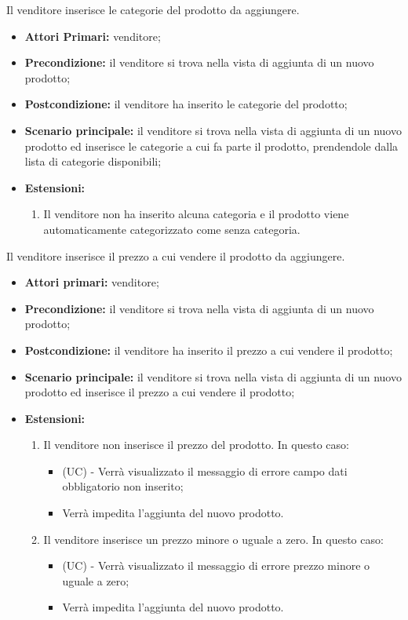 Il venditore inserisce le categorie del prodotto da aggiungere.
\begin{itemize}
    \item \textbf{Attori Primari:} venditore;
    \item \textbf{Precondizione:} il venditore si trova nella vista di aggiunta di un nuovo prodotto;
    \item \textbf{Postcondizione:} il venditore ha inserito le categorie del prodotto;
    \item \textbf{Scenario principale:} il venditore si trova nella vista di aggiunta di un nuovo prodotto ed inserisce le categorie a cui fa parte il prodotto, prendendole dalla lista di categorie disponibili;
    \item \textbf{Estensioni:}
    \begin{enumerate}
    	\item Il venditore non ha inserito alcuna categoria e il prodotto viene automaticamente categorizzato come senza categoria.
    \end{enumerate}
\end{itemize}

Il venditore inserisce il prezzo a cui vendere il prodotto da aggiungere.
\begin{itemize}
    \item \textbf{Attori primari:} venditore;
    \item \textbf{Precondizione:} il venditore si trova nella vista di aggiunta di un nuovo prodotto;
    \item \textbf{Postcondizione:} il venditore ha inserito il prezzo a cui vendere il prodotto;
    \item \textbf{Scenario principale:} il venditore si trova nella vista di aggiunta di un nuovo prodotto ed inserisce il prezzo a cui vendere il prodotto;
    \item \textbf{Estensioni:}
    \begin{enumerate}
    	\item Il venditore non inserisce il prezzo del prodotto. In questo caso:
    	\begin{itemize}
    		\item (UC) - Verrà visualizzato il messaggio di errore campo dati obbligatorio non inserito;
    		\item Verrà impedita l'aggiunta del nuovo prodotto.
    	\end{itemize}
    	\item Il venditore inserisce un prezzo minore o uguale a zero. In questo caso:
    	\begin{itemize}
    		\item (UC) - Verrà visualizzato il messaggio di errore prezzo minore o uguale a zero;
    		\item Verrà impedita l'aggiunta del nuovo prodotto.
    	\end{itemize}
    \end{enumerate}
\end{itemize}

